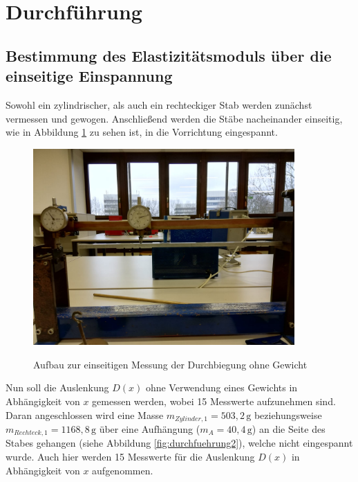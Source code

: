 \section{Durchführung}
\label{sec:Durchführung}

\subsection{Bestimmung des Elastizitätsmoduls über die einseitige Einspannung}

Sowohl ein zylindrischer, als auch ein rechteckiger Stab werden zunächst vermessen und gewogen.
Anschließend werden die Stäbe nacheinander einseitig, wie in Abbildung \ref{fig:durchfuehrung1} 
zu sehen ist, in die Vorrichtung eingespannt. 

\begin{figure}[h]
    \centering
    \includegraphics[width=10cm]{1.jpg}
    \label{fig:durchfuehrung1}
    \caption{Aufbau zur einseitigen Messung der Durchbiegung ohne Gewicht}
\end{figure}
\noindent
Nun soll die Auslenkung $D(x)$ ohne Verwendung eines Gewichts in 
Abhängigkeit von $x$ gemessen werden, wobei 15 Messwerte aufzunehmen sind. Daran angeschlossen
wird eine Masse $m_{Zylinder,1} = 503,2\, \si{\gram}$ beziehungsweise 
$m_{Rechteck,1} = 1168,8\, \si{\gram}$ über eine Aufhängung ($m_{A} = 40,4\, \si{\gram}$) 
an die Seite des Stabes gehangen (siehe Abbildung \ref{fig:durchfuehrung2}), welche 
nicht eingespannt wurde. Auch hier werden 15 Messwerte für die Auslenkung $D(x)$ in 
Abhängigkeit von $x$ aufgenommen. 

